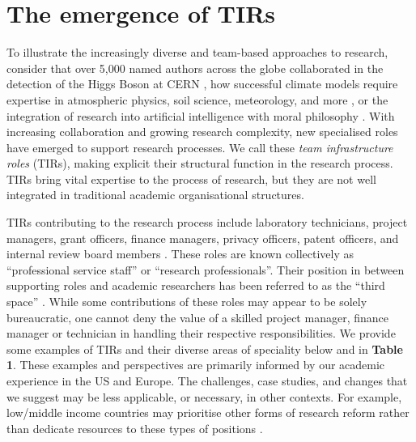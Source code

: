 \documentclass[authordate,meta]{jote-new-article}
\begin{document}
\section{The emergence of TIRs}







To illustrate the increasingly diverse and team-based approaches to research, consider that over 5,000 named authors across the globe collaborated in the detection of the Higgs Boson at CERN \parencites{Castelvecchi2015}, how successful climate models require expertise in atmospheric physics, soil science, meteorology, and more \parencites{Huebner2017}, or the integration of research into artificial intelligence with moral philosophy \parencites{Jobin2019}. With increasing collaboration and growing research complexity, new specialised roles have emerged to support research processes. We call these \emph{team infrastructure roles }(TIRs), making explicit their structural function in the research process. TIRs bring vital expertise to the process of research, but they are not well integrated in traditional academic organisational structures.











TIRs contributing to the research process include laboratory technicians, project managers, grant officers, finance managers, privacy officers, patent officers, and internal review board members \parencites{Heffner1979}{UKRI2023}. These roles are known collectively as “professional service staff” or “research professionals”. Their position in between supporting roles and academic researchers has been referred to as the “third space” \parencites{Whitchurch2008}. While some contributions of these roles may appear to be solely bureaucratic, one cannot deny the value of a skilled project manager, finance manager or technician in handling their respective responsibilities. We provide some examples of TIRs and their diverse areas of speciality below and in \textbf{Table 1}. These examples and perspectives are primarily informed by our academic experience in the US and Europe. The challenges, case studies, and changes that we suggest may be less applicable, or necessary, in other contexts. For example, low/middle income countries may prioritise other forms of research reform rather than dedicate resources to these types of positions \parencites{Bezuidenhout2018}{Bezuidenhout2017}{Onie2020}.
\end{document}
